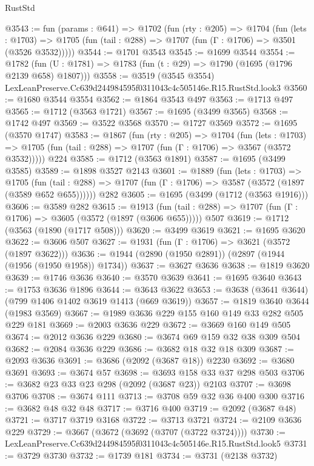 \begin{lexlean}{RustStd}
\begin{coremodule}
@3543 := fun (params : @641) =>
  @1702
    (fun (rty : @205) =>
    @1704
      (fun (lets : @1703) =>
      @1705 (fun (tail : @288) => @1707 (fun (Γ : @1706) => @3501 (@3526 @3532)))))
@3544 := @1701 @3543
@3545 := @1699 @3544
@3554 := @1782 (fun (U : @1781) => @1783 (fun (t : @29) => @1790 (@1695 (@1796 @2139 @658) @1807)))
@3558 := @3519 (@3545 @3554) LexLeanPreserve.Cc639d244984595f0311043c4c505146e.R15.RustStd.look3
@3560 := @1680 @3544 @3554
@3562 := @1864 @3543 @497
@3563 := @1713 @497
@3565 := @1712 (@3563 @1721)
@3567 := @1695 (@3499 @3565)
@3568 := @1742 @497
@3569 := @3522 @3568
@3570 := @1727 @3569
@3572 := @1695 (@3570 @1747)
@3583 := @1867
    (fun (rty : @205) =>
    @1704
      (fun (lets : @1703) =>
      @1705 (fun (tail : @288) => @1707 (fun (Γ : @1706) => @3567 (@3572 @3532)))))
    @224
@3585 := @1712 (@3563 @1891)
@3587 := @1695 (@3499 @3585)
@3589 := @1898 @3527 @2143
@3601 := @1889
    (fun (lets : @1703) =>
    @1705 (fun (tail : @288) => @1707 (fun (Γ : @1706) => @3587 (@3572 (@1897 (@3589 @652 @655))))))
    @282
@3605 := @1695 (@3499 (@1712 (@3563 @1916)))
@3606 := @3589 @282
@3615 := @1913
    (fun (tail : @288) => @1707 (fun (Γ : @1706) => @3605 (@3572 (@1897 (@3606 @655)))))
    @507
@3619 := @1712 (@3563 (@1890 (@1717 @508)))
@3620 := @3499 @3619
@3621 := @1695 @3620
@3622 := @3606 @507
@3627 := @1931 (fun (Γ : @1706) => @3621 (@3572 (@1897 @3622)))
@3636 := @1944 (@2890 (@1950 @2891)) (@2897 (@1944 (@1956 (@1950 @1958)) @1734))
@3637 := @3627 @3636
@3638 := @1819 @3620
@3639 := @1746 @3636
@3640 := @3570 @3639
@3641 := @1695 @3640
@3643 := @1753 @3636 @1896
@3644 := @3643 @3622
@3653 := @3638 (@3641 @3644) (@799 @1406 @1402 @3619 @1413 (@669 @3619))
@3657 := @1819 @3640 @3644 (@1983 @3569)
@3667 := @1989 @3636 @229 @155 @160 @149 @33 @282 @505 @229 @181
@3669 := @2003 @3636 @229
@3672 := @3669 @160 @149 @505
@3674 := @2012 @3636 @229
@3680 := @3674 @69 @159 @32 @38 @309 @504
@3682 := @2084 @3636 @229
@3686 := @3682 @18 @32 @18 @309
@3687 := @2093 @3636
@3691 := @3686 (@2092 (@3687 @18)) @2230
@3692 := @3680 @3691
@3693 := @3674 @57
@3698 := @3693 @158 @33 @37 @298 @503
@3706 := @3682 @23 @33 @23 @298 (@2092 (@3687 @23)) @2103
@3707 := @3698 @3706
@3708 := @3674 @111
@3713 := @3708 @59 @32 @36 @400 @300
@3716 := @3682 @48 @32 @48
@3717 := @3716 @400
@3719 := @2092 (@3687 @48)
@3721 := @3717 @3719 @3168
@3722 := @3713 @3721
@3724 := @2109 @3636 @229
@3729 := @3667 (@3672 (@3692 (@3707 (@3722 @3724))))
@3730 := LexLeanPreserve.Cc639d244984595f0311043c4c505146e.R15.RustStd.look5
@3731 := @3729 @3730
@3732 := @1739 @181
@3734 := @3731 (@2138 @3732)

\end{coremodule}
\end{lexlean}
